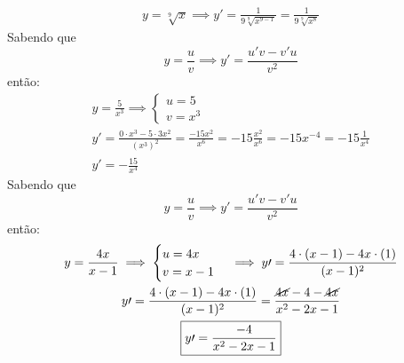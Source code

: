 \documentclass{jhwhw}
\begin{document}
\begin{align*}
    y = \sqrt[9]{x} \implies y\prime = \frac{1}{9\sqrt[9]{x^{9-1}}} = \frac{1}{9\sqrt[9]{x^{8}}}
\end{align*}
Sabendo que \[
    y = \frac{u}{v} \implies y\prime = \frac{u\prime v - v\prime u}{v^2}
\] então:
\begin{multline*}
    y = \frac{5}{x^3} \implies \begin{cases}
        u = 5 \\
        v = x^3
    \end{cases}\\
    y\prime = \frac{0 \cdot x^3 - 5 \cdot 3x^2}{(x^3)^2}
    = \frac{-15x^2}{x^6}
    = -15 \frac{x^2}{x^6} = -15 x^{-4} = -15 \frac{1}{x^4} \\ \boxed{y\prime = -\frac{15}{x^4}}
\end{multline*}
Sabendo que \[
    y = \frac{u}{v} \implies y\prime = \frac{u\prime v - v\prime u}{v^2}
\] então:
\begin{multline*}
    y = \frac{4x}{x-1} \implies \begin{cases}
        u = 4x \\
        v = x-1
    \end{cases} \implies y\prime = \frac{4 \cdot (x-1) - 4x \cdot (1)}{(x-1)^2}\\
    y\prime = \frac{4 \cdot (x-1) - 4x \cdot (1)}{(x-1)^2} = \frac{\cancel{4x}-4-\cancel{4x}}{x^2-2x-1} \\ \boxed{y\prime = \frac{-4}{x^2-2x-1}}
\end{multline*}
\newpage
\reset
\end{document}
